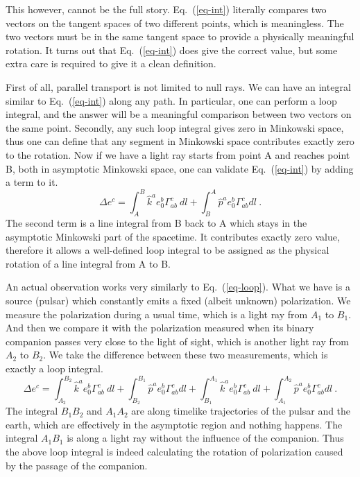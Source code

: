 \documentclass[aps,showpacs,onecolumn,floats,prd,superscriptaddress,nofootinbib]{revtex4}
\begin{document}
This however, cannot be the full story. 
Eq.~(\ref{eq-int}) literally compares two vectors on the tangent spaces of two different points, which is meaningless. 
The two vectors must be in the same tangent space to provide a physically meaningful rotation. 
It turns out that Eq.~(\ref{eq-int}) does give the correct value, but some extra care is required to give it a clean definition.

First of all, parallel transport is not limited to null rays. 
We can have an integral similar to Eq.~(\ref{eq-int}) along any path. 
In particular, one can perform a loop integral, and the answer will be a meaningful comparison between two vectors on the same point. 
Secondly, any such loop integral gives zero in Minkowski space, thus one can define that any segment in Minkowski space contributes exactly zero to the rotation. 
Now if we have a light ray starts from point A and reaches point B, both in asymptotic Minkowski space, one can validate Eq.~(\ref{eq-int}) by adding a term to it.
\begin{equation}
\Delta e^c = \int_A^B \hat{k}^a e_0^b \Gamma_{ab}^c~dl +
 \int_B^A \hat{p}^a e_0^b \Gamma_{ab}^c dl~.
\label{eq-loop}
\end{equation}
The second term is a line integral from B back to A which stays in the asymptotic Minkowski part of the spacetime. 
It contributes exactly zero value, therefore it allows a well-defined loop integral to be assigned as the physical rotation of a line integral from A to B.

An actual observation works very similarly to Eq.~(\ref{eq-loop}). 
What we have is a source (pulsar) which constantly emits a fixed (albeit unknown) polarization. 
We measure the polarization during a usual time, which is a light ray from $A_1$ to $B_1$. 
And then we compare it with the polarization measured when its binary companion passes very close to the light of sight, which is another light ray from $A_2$ to $B_2$. 
We take the difference between these two measurements, which is exactly a loop integral.
\begin{equation}
\Delta e^c = \int_{A_2}^{B_2} \hat{k}^a e_0^b \Gamma_{ab}^c~dl +
\int_{B_2}^{B_1} \hat{p}^a e_0^b \Gamma_{ab}^c dl +
\int_{B_1}^{A_1} \hat{k}^a e_0^b \Gamma_{ab}^c~dl +
\int_{A_1}^{A_2} \hat{p}^a e_0^b \Gamma_{ab}^c dl~.
\label{eq-pulsar}
\end{equation}
The integral $B_1B_2$ and $A_1A_2$ are along timelike trajectories of the pulsar and the earth, which are effectively in the asymptotic region and nothing happens. 
The integral $A_1B_1$ is along a light ray without the influence of the companion. 
Thus the above loop integral is indeed calculating the rotation of polarization caused by the passage of the companion.
\end{document}
